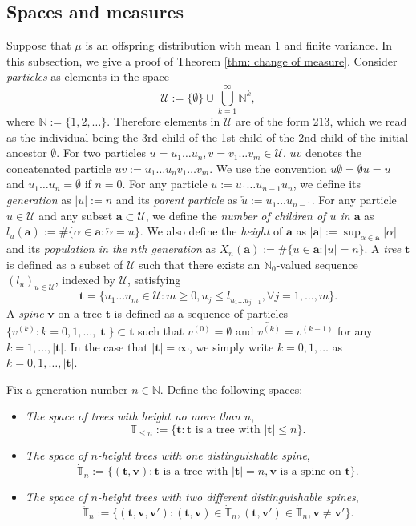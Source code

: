 \documentclass[UTF8]{pkuthss}
\theoremstyle{plain}
\theoremstyle{definition}
\numberwithin{equation}{section}
\begin{document}
\subsection{Spaces and measures}
\label{sec:spacesandmeasures}
	Suppose that $\mu$ is an offspring distribution with mean $1$ and finite variance. In this subsection, we give a proof of Theorem \ref{thm: change of measure}.
Consider \emph{particles} as elements in the space
\[
\mathcal U
:=
\{\emptyset\}\cup\bigcup_{k=1}^\infty \mathbb N^k,
\]
where $\mathbb N:=\{1,2,\dots\}$.
Therefore elements in $\mathcal U$ are of the form 213, which we read as the individual being the 3rd child of the 1st child of the 2nd child of the initial ancestor $\emptyset$.
For two particles $u=u_1\dots u_n, v=v_1\dots v_m\in\mathcal U$, $uv$ denotes the concatenated particle $uv:=u_1\dots u_nv_1\dots v_m$.
We use the convention $u\emptyset = \emptyset u = u$ and $u_1\dots u_n=\emptyset$ if $n=0$.
For any particle $u:=u_1\dots u_{n-1}u_n$, we define its \emph{generation} as $| u |:=n$ and its \emph{parent particle} as $\overleftarrow{u}:=u_1\dots u_{n-1}$.
For any particle $u \in \mathcal U$ and any subset $\mathbf a \subset \mathcal U$, we define the \emph{number of children of $u$ in $\mathbf a$} as $l_u(\mathbf a) := \#\{\alpha\in \mathbf a:\overleftarrow{\alpha}=u\} $.
We also define the \emph{height} of $\mathbf a$ as $|\mathbf a|:=\sup_{\alpha\in \mathbf a}|\alpha|$ and its \emph{population in the $n$th generation} as $X_n(\mathbf a):=\#\{u\in \mathbf a:|u|=n\}$.
A \emph{tree} $ \mathbf t $ is defined as a subset of $\mathcal U$ such that there exists an $\mathbb N_0$-valued sequence $(l_u)_{u\in \mathcal U}$,
indexed by $\mathcal U$, satisfying
\[
\mathbf t
=\{u_1\dots u_m\in \mathcal U: m\ge 0, u_j\leq l_{u_1\dots u_{j-1}}, \forall  j=1,\dots,m\}.
\]
A \emph{spine} $ \mathbf v$ on a  tree $ \mathbf t $ is defined as a sequence of particles $\{v^{(k)}:k=0,1,\dots,| \mathbf t |\}\subset \mathbf t $ such that $v^{(0)}=\emptyset$ and $\overleftarrow{v^{(k)}}=v^{(k-1)}$ for any $k=1,\dots, | \mathbf t |$.
In the case that $| \mathbf t |=\infty$, we simply write $k=0,1,\dots$ as $k=0,1,\dots, | \mathbf t |$.

Fix a generation number $n\in \mathbb N$. Define the following spaces:
\begin{itemize}
	\item
	\emph{The space of trees with height no more than $n$},
	\[
	\mathbb T_{\leq n}
	:=\{ \mathbf t : \mathbf t \text{ is a tree with }| \mathbf t | \leq n\}.
	\]
	\item
	\emph {The space of $n$-height trees with one distinguishable spine},
	\[
	\dot{\mathbb T}_n
	:=\{( \mathbf t , \mathbf v): \mathbf t  \text{ is a tree with } | \mathbf t |=n,  \mathbf v \text{ is a spine on }  \mathbf t \}.
	\]
	\item
	\emph{The space of $n$-height trees with two different distinguishable spines},
	\[
	\ddot{\mathbb T}_n
	:=\{( \mathbf t , \mathbf v, \mathbf v'):( \mathbf t , \mathbf v)\in\dot{\mathbb T}_n,( \mathbf t , \mathbf v')\in\dot{\mathbb T}_n, \mathbf v\neq \mathbf v'\}.
	\]
\end{itemize}
\end{document}
